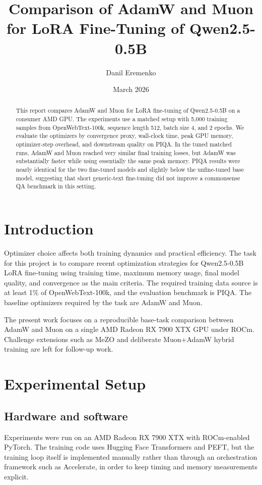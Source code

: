 \documentclass[11pt]{article}
\title{Comparison of AdamW and Muon for LoRA Fine-Tuning of Qwen2.5-0.5B}
\author{Danil Eremenko}
\date{March 2026}
\begin{document}
\maketitle

\begin{abstract}
This report compares AdamW and Muon for LoRA fine-tuning of Qwen2.5-0.5B on a consumer AMD GPU.
The experiments use a matched setup with 5,000 training samples from OpenWebText-100k, sequence length 512, batch size 4, and 2 epochs.
We evaluate the optimizers by convergence proxy, wall-clock time, peak GPU memory, optimizer-step overhead, and downstream quality on PIQA.
In the tuned matched runs, AdamW and Muon reached very similar final training losses, but AdamW was substantially faster while using essentially the same peak memory.
PIQA results were nearly identical for the two fine-tuned models and slightly below the unfine-tuned base model, suggesting that short generic-text fine-tuning did not improve a commonsense QA benchmark in this setting.
\end{abstract}

\section{Introduction}
Optimizer choice affects both training dynamics and practical efficiency.
The task for this project is to compare recent optimization strategies for Qwen2.5-0.5B LoRA fine-tuning using training time, maximum memory usage, final model quality, and convergence as the main criteria.
The required training data source is at least 1\% of OpenWebText-100k, and the evaluation benchmark is PIQA.
The baseline optimizers required by the task are AdamW and Muon.

The present work focuses on a reproducible base-task comparison between AdamW and Muon on a single AMD Radeon RX 7900 XTX GPU under ROCm.
Challenge extensions such as MeZO and deliberate Muon+AdamW hybrid training are left for follow-up work.

\section{Experimental Setup}
\subsection{Hardware and software}
Experiments were run on an AMD Radeon RX 7900 XTX with ROCm-enabled PyTorch.
The training code uses Hugging Face Transformers and PEFT, but the training loop itself is implemented manually rather than through an orchestration framework such as Accelerate, in order to keep timing and memory measurements explicit.
\end{document}
